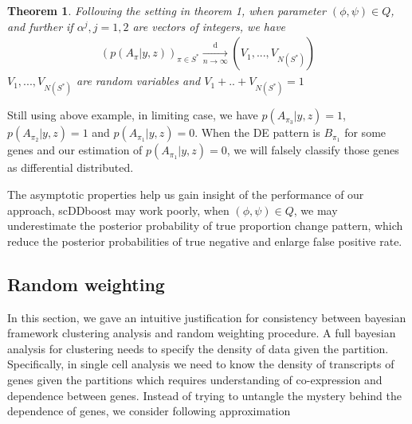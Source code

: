 \documentclass[aoas,preprint]{imsart}
\newtheorem{theorem}{Theorem}
\begin{document}
\begin{theorem} Following the setting in theorem 1, when parameter $(\phi, \psi)\in Q$,  and further if $\alpha^j, j = 1,2$ are vectors of integers, we have 
\begin{eqnarray*}
    (p(A_{\pi} | y, z))_{\pi\in S^*} \xrightarrow[n\rightarrow\infty]{\text{d}}%
                (V_1, ..., V_{N(S^*)})
\end{eqnarray*}
$V_1, ..., V_{N(S^*)}$ are random variables and $V_1 + .. + V_{N(S^*)} = 1$
 \end{theorem} 

Still using above example, in limiting case, we have $p(A_{\pi_3} | y,z) = 1$, $p(A_{\pi_2} | y,z) = 1$ and $p(A_{\pi_1}| y,z) = 0$. When the DE pattern is $B_{\pi_1}$ for some genes and our estimation of $p(A_{\pi_1}| y,z) = 0$, we will falsely classify those genes as differential distributed.

The asymptotic properties help us gain insight of the performance of our approach,
scDDboost may work poorly, when $(\phi, \psi)\in Q$, we may underestimate the posterior probability of true proportion change pattern, which reduce the posterior probabilities of true negative and enlarge false positive rate.\\

\subsection{Random weighting}
In this section, we gave an intuitive justification for consistency between bayesian framework clustering analysis and random weighting procedure. A full bayesian analysis for clustering needs to specify the density of data given the partition. Specifically, in single cell analysis we need to know the density of transcripts of genes given the partitions which requires understanding of co-expression and dependence between genes. Instead of trying to untangle the mystery behind the dependence of genes, we consider following approximation 
\end{document}
